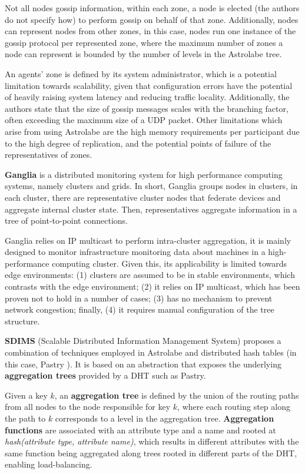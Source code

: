 Not all nodes gossip information, within each zone, a node is elected (the authors do not specify how) to perform gossip on behalf of that zone. Additionally, nodes can represent nodes from other zones, in this case, nodes run one instance of the gossip protocol per represented zone, where the maximum number of zones a node can represent is bounded by the number of levels in the Astrolabe tree.

An agents' zone is defined by its system administrator, which is a potential limitation towards scalability, given that configuration errors have the potential of heavily raising system latency and reducing traffic locality. Additionally, the authors state that the size of gossip messages scales with the branching factor, often exceeding the maximum size of a UDP packet. Other limitations which arise from using Astrolabe are the high memory requirements per participant due to the high degree of replication, and the potential points of failure of the representatives of zones.

\textbf{Ganglia} \cite{massie2004ganglia} is a distributed monitoring system for high performance computing systems, namely clusters and grids. In short, Ganglia groups nodes in clusters, in each cluster, there are representative cluster nodes that federate devices and aggregate internal cluster state. Then, representatives aggregate information in a tree of point-to-point connections.

Ganglia relies on IP multicast to perform intra-cluster aggregation, it is mainly designed to monitor infrastructure monitoring data about machines in a high-performance computing cluster. Given this, its applicability is limited towards edge environments: (1) clusters are assumed to be in stable environments, which contrasts with the edge environment; (2) it relies on IP multicast, which has been proven not to hold in a number of cases; (3) has no mechanism to prevent network congestion; finally, (4) it requires manual configuration of the tree structure.

\textbf{SDIMS} \cite{SDIMS} (Scalable Distributed Information Management System) proposes a combination of techniques employed in Astrolabe \cite{Renesse2003} and distributed hash tables (in this case, Pastry \cite{rowstron2001pastry}). It is based on an abstraction that exposes the underlying \textbf{aggregation trees} provided by a DHT such as Pastry. 

Given a key $k$, an \textbf{aggregation tree} is defined by the union of the routing paths from all nodes to the node responsible for key $k$, where each routing step along the path to $k$ corresponds to a level in the aggregation tree. \textbf{Aggregation functions} are associated with an attribute type and a name and rooted at \textit{hash(attribute type, attribute name)}, which results in different attributes with the same function being aggregated along trees rooted in different parts of the DHT, enabling load-balancing.

